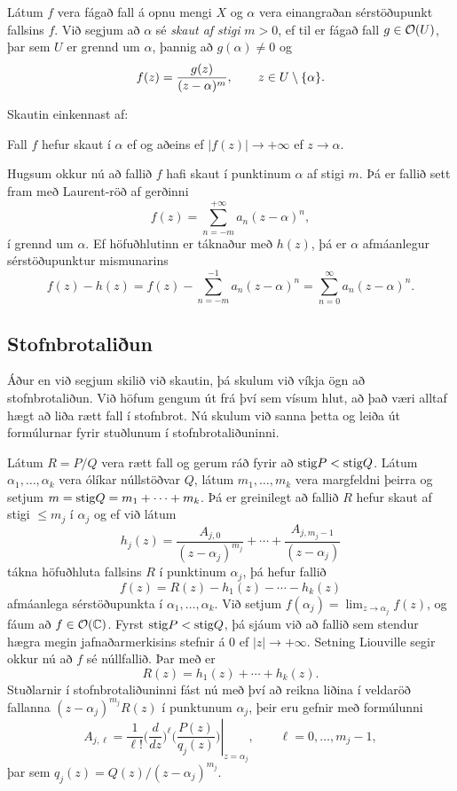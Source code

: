 \begin{sk}  Látum $f$ vera fágað fall á opnu mengi $X$ og $\alpha$ vera
einangraðan sérstöðupunkt fallsins $f$. 
Við segjum að $\alpha$ sé {\it skaut af stigi}
$m>0$, ef til er fágað fall $g\in {\cal O}(U)$, þar sem $U$ er grennd um
$\alpha$, þannig að $g(\alpha)\neq 0$ og 
 $$f(z)=\dfrac{g(z)}{(z-\alpha)\sp m}, \qquad z\in U\setminus{\{\alpha\}}.
 $$
\end{sk}

Skautin einkennast af:


\begin{se} Fall $f$ hefur skaut í $\alpha$ ef og aðeins ef
$|f(z)|\to +\infty$ ef $z\to \alpha$.

{}
\end{se}

Hugsum okkur nú að fallið $f$  hafi skaut í punktinum $\alpha$
af stigi $m$. Þá er fallið sett fram með Laurent-röð af gerðinni
 $$f(z)=\sum\limits_{n=-m}^{+\infty} a_n(z-\alpha)^n,
 $$
í grennd um $\alpha$.  Ef höfuðhlutinn er táknaður með $h(z)$, þá er
$\alpha$ afmáanlegur sérstöðupunktur mismunarins
 $$f(z)-h(z) =f(z)-\sum\limits_{n=-m}^{-1} a_n(z-\alpha)^n 
= \sum\limits_{n=0}^\infty a_n(z-\alpha)^n. 
 $$


\subsection*{Stofnbrotaliðun}

{Á}ður en við segjum skilið við skautin, þá skulum við víkja ögn að
stofnbrotaliðun.  Við höfum gengum út frá
því sem vísum hlut, að það væri alltaf hægt að liða rætt fall í
stofnbrot. Nú skulum við sanna þetta og leiða út
formúlurnar fyrir stuðlunum í stofnbrotaliðuninni.

Látum $R=P/Q$ vera rætt fall og gerum ráð fyrir að ${\operatorname{stig}} P<{\operatorname{stig}} Q$.
Látum $\alpha_1,\dots,\alpha_k$ vera ólíkar núllstöðvar $Q$, látum
$m_1,\dots,m_k$ vera margfeldni þeirra og setjum $m={\operatorname{stig}} Q=m_1+\cdots+m_k$.
Þá er greinilegt að fallið $R$ hefur skaut af stigi $\leq m_j$ í
$\alpha_j$ og ef við látum 
 $$h_j(z)=\dfrac{A_{j,0}}{(z-\alpha_j)^{m_j}}+\cdots+
\dfrac{A_{j,m_j-1}}{(z-\alpha_j)}
 $$
tákna höfuðhluta fallsins $R$ í punktinum $\alpha_j$, þá hefur fallið
 $$f(z)= R(z)-h_1(z)-\cdots-h_k(z)
 $$
afmáanlega sérstöðupunkta í $\alpha_1,\dots,\alpha_k$.  Við setjum
$f(\alpha_j)=\lim_{z\to \alpha_j}f(z)$, og fáum  að $f\in
{\cal O}({\mathbb C})$.  Fyrst ${\operatorname{stig}} P <{\operatorname{stig}} Q$, þá sjáum við að  fallið sem
stendur hægra megin jafnaðarmerkisins stefnir á $0$ ef $|z|\to
+\infty$.    Setning Liouville segir okkur nú að $f$ sé núllfallið.
Þar með er
 $$R(z)=h_1(z)+\cdots+h_k(z).
 $$
Stuðlarnir í stofnbrotaliðuninni fást nú með því að 
reikna liðina í veldaröð fallanna $(z-\alpha_j)^{m_j}R(z)$
í punktunum $\alpha_j$, þeir eru gefnir með formúlunni
$$ A_{j,\ell}=\left.\dfrac 1{\ell!}
\bigg(\dfrac {d}{dz}\bigg)^{\ell}\bigg(
\dfrac{P(z)}{q_j(z)}\bigg)\right|_{z=\alpha_j}, \qquad \ell=0,\dots,m_j-1,
$$
þar sem $q_j(z)=Q(z)/(z-\alpha_j)^{m_j}$.

